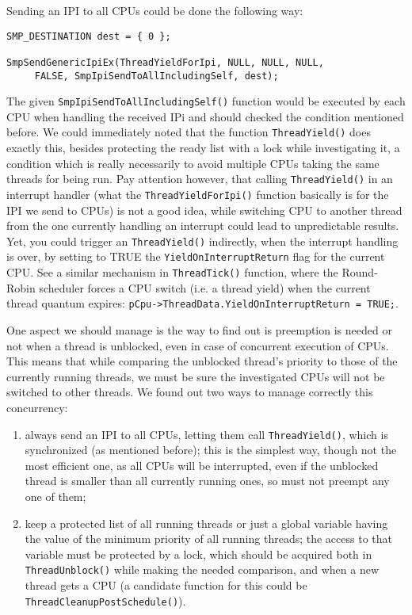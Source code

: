 Sending an IPI to all CPUs could be done the following way:
\begin{lstlisting}
SMP_DESTINATION dest = { 0 };

SmpSendGenericIpiEx(ThreadYieldForIpi, NULL, NULL, NULL, 
     FALSE, SmpIpiSendToAllIncludingSelf, dest);    
\end{lstlisting}

The given \lstinline|SmpIpiSendToAllIncludingSelf()| function would be executed by each CPU when handling the received IPi and should checked the condition mentioned before. We could immediately noted that the function \lstinline|ThreadYield()| does exactly this, besides protecting the ready list with a lock while investigating it, a condition which is really necessarily to avoid multiple CPUs taking the same threads for being run. Pay attention however, that calling \lstinline|ThreadYield()| in an interrupt handler (what the \lstinline|ThreadYieldForIpi()| function basically is for the IPI we send to CPUs) is not a good idea, while switching CPU to another thread from the one currently handling an interrupt could lead to unpredictable results. Yet, you could trigger an \lstinline|ThreadYield()| indirectly, when the interrupt handling is over, by setting to TRUE the \lstinline|YieldOnInterruptReturn| flag for the current CPU. See a similar mechanism in \lstinline|ThreadTick()| function, where the Round-Robin scheduler forces a CPU switch (i.e. a thread yield) when the current thread quantum expires: \lstinline|pCpu->ThreadData.YieldOnInterruptReturn = TRUE;|.

One aspect we should manage is the way to find out is preemption is needed or not when a thread is unblocked, even in case of concurrent execution of CPUs. This means that while comparing the unblocked thread's priority to those of the currently running threads, we must be sure the investigated CPUs will not be switched to other threads. We found out two ways to manage correctly this concurrency:
\begin{enumerate}
    \item always send an IPI to all CPUs, letting them call \lstinline|ThreadYield()|, which is synchronized (as mentioned before); this is the simplest way, though not the most efficient one, as all CPUs will be interrupted, even if the unblocked thread is smaller than all currently running ones, so must not preempt any one of them;
    
    \item keep a protected list of all running threads or just a global variable having the value of the minimum priority of all running threads; the access to that variable must be protected by a lock, which should be acquired both in \lstinline|ThreadUnblock()| while making the needed comparison, and when a new thread gets a CPU (a candidate function for this could be \lstinline|ThreadCleanupPostSchedule()|).
\end{enumerate}


